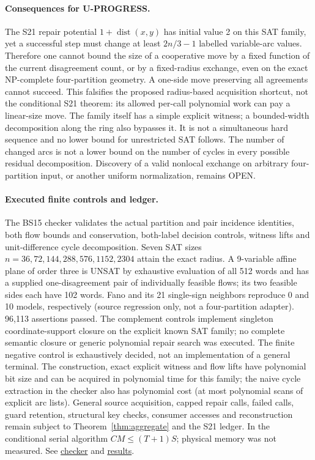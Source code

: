 \documentclass[11pt]{article}
\begin{document}
\paragraph{Consequences for U-PROGRESS.}
The S21 repair potential $1+\operatorname{dist}(x,y)$ has initial value 2 on this SAT family, yet a successful step must change at least $2n/3-1$ labelled variable-arc values. Therefore one cannot bound the size of a cooperative move by a fixed function of the current disagreement count, or by a fixed-radius exchange, even on the exact NP-complete four-partition geometry. A one-side move preserving all agreements cannot succeed. This falsifies the proposed radius-based acquisition shortcut, not the conditional S21 theorem: its allowed per-call polynomial work can pay a linear-size move. The family itself has a simple explicit witness; a bounded-width decomposition along the ring also bypasses it. It is not a simultaneous hard sequence and no lower bound for unrestricted SAT follows. The number of changed arcs is not a lower bound on the number of cycles in every possible residual decomposition. Discovery of a valid nonlocal exchange on arbitrary four-partition input, or another uniform normalization, remains OPEN.

\paragraph{Executed finite controls and ledger.}
The BS15 checker validates the actual partition and pair incidence identities, both flow bounds and conservation, both-label decision controls, witness lifts and unit-difference cycle decomposition. Seven SAT sizes $n=36,72,144,288,576,1152,2304$ attain the exact radius. A 9-variable affine plane of order three is UNSAT by exhaustive evaluation of all 512 words and has a supplied one-disagreement pair of individually feasible flows; its two feasible sides each have 102 words. Fano and its 21 single-sign neighbors reproduce 0 and 10 models, respectively (source regression only, not a four-partition adapter). 96,113 assertions passed. The complement controls implement singleton coordinate-support closure on the explicit known SAT family; no complete semantic closure or generic polynomial repair search was executed. The finite negative control is exhaustively decided, not an implementation of a general terminal. The construction, exact explicit witness and flow lifts have polynomial bit size and can be acquired in polynomial time for this family; the naive cycle extraction in the checker also has polynomial cost (at most polynomial scans of explicit arc lists). General source acquisition, capped repair calls, failed calls, guard retention, structural key checks, consumer accesses and reconstruction remain subject to Theorem~\ref{thm:aggregate} and the S21 ledger. In the conditional serial algorithm $CM\le(T+1)S$; physical memory was not measured. See \href{https://github.com/j15marti/pnp/commit/61486225f8ce8115f8735dd8e069ad986cd12164}{checker} and \href{https://github.com/j15marti/pnp/commit/16844049d48e0c0ecaa33e402f45f5d20670cba4}{results}.
\end{document}
